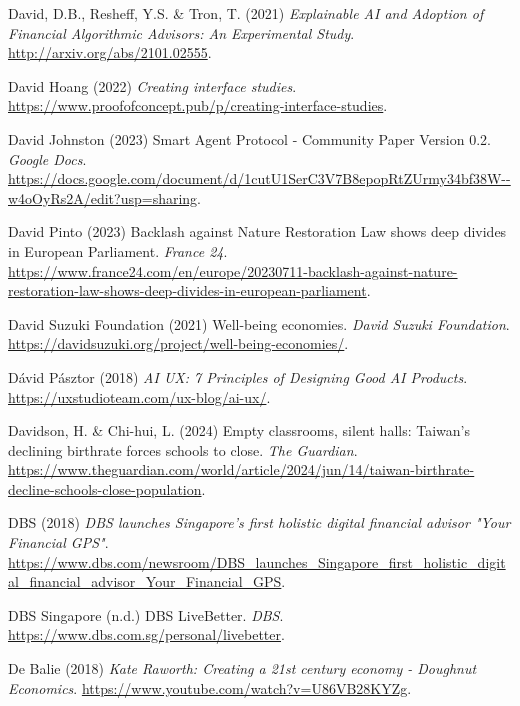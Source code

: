 \documentclass[
  letterpaper,
  DIV=11,
  numbers=noendperiod]{scrartcl}
\newlength{\cslhangindent}
\newenvironment{CSLReferences}[2] %
 {\begin{list}{}{%
  \setlength{\itemindent}{0pt}
  \setlength{\leftmargin}{0pt}
  \setlength{\parsep}{0pt}
  \ifodd #1
   \setlength{\leftmargin}{\cslhangindent}
   \setlength{\itemindent}{-1\cslhangindent}
  \fi
  \setlength{\itemsep}{#2\baselineskip}}}
 {\end{list}}
\begin{document}
\begin{CSLReferences}{0}{1}
David, D.B., Resheff, Y.S. \& Tron, T. (2021) \emph{Explainable {AI} and
{Adoption} of {Financial Algorithmic Advisors}: An {Experimental
Study}}. \url{http://arxiv.org/abs/2101.02555}.

David Hoang (2022) \emph{Creating interface studies}.
\url{https://www.proofofconcept.pub/p/creating-interface-studies}.

David Johnston (2023) Smart {Agent Protocol} - {Community Paper Version}
0.2. \emph{Google Docs}.
\url{https://docs.google.com/document/d/1cutU1SerC3V7B8epopRtZUrmy34bf38W--w4oOyRs2A/edit?usp=sharing}.

David Pinto (2023) Backlash against {Nature Restoration Law} shows deep
divides in {European Parliament}. \emph{France 24}.
\url{https://www.france24.com/en/europe/20230711-backlash-against-nature-restoration-law-shows-deep-divides-in-european-parliament}.

David Suzuki Foundation (2021) Well-being economies. \emph{David Suzuki
Foundation}.
\url{https://davidsuzuki.org/project/well-being-economies/}.

Dávid Pásztor (2018) \emph{{AI UX}: 7 {Principles} of {Designing Good AI
Products}}. \url{https://uxstudioteam.com/ux-blog/ai-ux/}.

Davidson, H. \& Chi-hui, L. (2024) Empty classrooms, silent halls:
{Taiwan}'s declining birthrate forces schools to close. \emph{The
Guardian}.
\url{https://www.theguardian.com/world/article/2024/jun/14/taiwan-birthrate-decline-schools-close-population}.

DBS (2018) \emph{{DBS} launches {Singapore}'s first holistic digital
financial advisor "{Your Financial GPS}"}.
\url{https://www.dbs.com/newsroom/DBS_launches_Singapore_first_holistic_digital_financial_advisor_Your_Financial_GPS}.

DBS Singapore (n.d.) {DBS LiveBetter}. \emph{DBS}.
\url{https://www.dbs.com.sg/personal/livebetter}.

De Balie (2018) \emph{Kate {Raworth}: {Creating} a 21st century economy
- {Doughnut Economics}}.
\url{https://www.youtube.com/watch?v=U86VB28KYZg}.


\end{CSLReferences}
\end{document}
